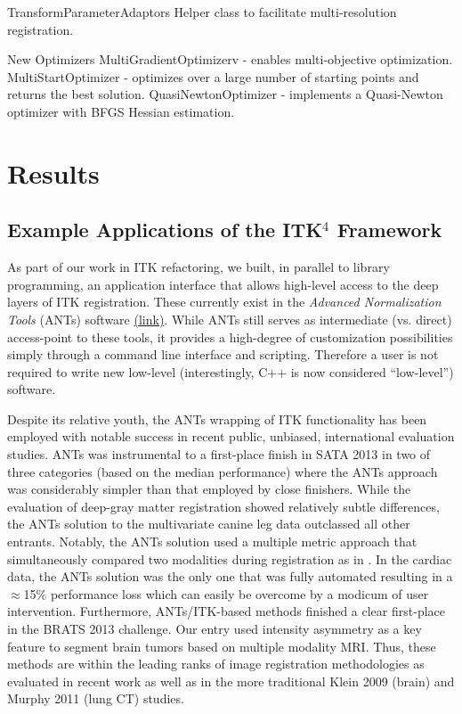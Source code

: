 \documentclass{frontiersSCNS}
\begin{document}
TransformParameterAdaptors
Helper class to facilitate multi-resolution registration.

New Optimizers
MultiGradientOptimizerv - enables multi-objective optimization.
MultiStartOptimizer - optimizes over a large number of starting points and returns the best solution.
QuasiNewtonOptimizer - implements a Quasi-Newton optimizer with BFGS Hessian estimation.





\section{Results}

\subsection{Example Applications of the ITK$^4$ Framework}
\label{sec:applications}
As part of our work in ITK refactoring, we built, in parallel to
library programming, an
application interface that allows high-level access to the deep layers
of ITK registration.  These currently exist in the {\em Advanced
  Normalization Tools} (ANTs) software
\href{http://stnava.github.io/ANTs}{(link)}.  While ANTs still serves
as intermediate (vs. direct) access-point to these tools, it provides
a high-degree of customization possibilities simply through a command
line interface and scripting.  Therefore a user is not required to
write new low-level (interestingly, C++ is now considered ``low-level'') software.  

Despite its relative youth, the ANTs wrapping of ITK functionality has
been employed with notable success in recent public, unbiased,
international evaluation studies.   ANTs was instrumental to a
first-place finish in SATA 2013 in two of three categories (based on
the median performance) where the ANTs approach was considerably
simpler than that employed by close finishers.  While the evaluation
of deep-gray matter registration showed relatively subtle differences,
the ANTs solution to the multivariate
canine leg data outclassed all other entrants.  Notably, the ANTs
solution used a multiple metric approach that simultaneously compared
two modalities during registration as in \cite{Avants2008}.  In the
cardiac data, the ANTs solution was the only one that was fully
automated resulting in a $\approx$15\% performance loss which can easily be
overcome by a modicum of user intervention.   Furthermore, ANTs/ITK-based
methods finished a clear first-place in the BRATS 2013 challenge.  Our entry
used intensity asymmetry as a key feature to segment brain tumors based
on multiple modality MRI.  Thus, these methods are within the leading
ranks of image registration methodologies as evaluated in recent work
as well as in the more traditional Klein 2009 (brain) and Murphy 2011
(lung CT) studies. 
\end{document}
